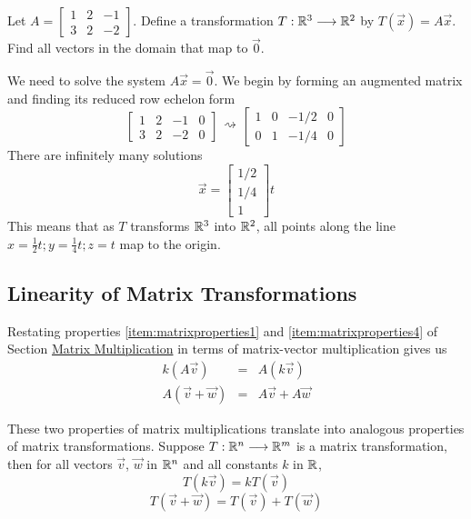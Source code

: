 \documentclass{ximera}
\begin{document}
\begin{example}\label{ex:matrixTrans1}
    Let $A=\begin{bmatrix}1&2&-1\\3&2&-2\end{bmatrix}$.  Define a transformation 
    $T:\mathbb{R}^3\longrightarrow\mathbb{R}^2$ by 
    $T(\vec{x})=A\vec{x}$.  Find all vectors in the domain that map to $\vec{0}$.
 \begin{explanation}
    We need to solve the system $A\vec{x}=\vec{0}$.  We begin by forming an augmented matrix and finding its reduced row echelon form
    $$\left[\begin{array}{ccc|c} 
 1&2&-1&0\\3&2&-2&0
 \end{array}\right]\begin{array}{c}
 \\
 \rightsquigarrow\\
 \\
 \end{array}\left[\begin{array}{ccc|c} 
 1&0&-1/2&0\\0&1&-1/4&0
 \end{array}\right]$$
 There are infinitely many solutions
 $$\vec{x}=\begin{bmatrix}1/2\\1/4\\1\end{bmatrix}t$$
 This means that as $T$ transforms $\mathbb{R}^3$ into $\mathbb{R}^2$, all points along the line $x=\frac{1}{2}t; y=\frac{1}{4}t; z=t$ map to the origin.
\end{explanation}    
\end{example}

\subsection*{Linearity of Matrix Transformations}
Restating properties \ref{item:matrixproperties1} and \ref{item:matrixproperties4} of Section \href{https://ximera.osu.edu/linearalgebradzv3/LinearAlgebraInteractiveIntro/MAT-0020/main}{Matrix Multiplication} in terms of matrix-vector multiplication gives us
\begin{eqnarray}\label{eq:linearityConstant}
 k(A\vec{v})&=&A(k\vec{v})\\
    A(\vec{v}+\vec{w})&=&A\vec{v}+A\vec{w}\label{eq:linearityAdd}
   \end{eqnarray}

These two properties of matrix multiplications translate into analogous properties of matrix transformations.  Suppose $T:\mathbb{R}^n\longrightarrow\mathbb{R}^m$ is a matrix transformation, then for all vectors $\vec{v}$, $\vec{w}$ in $\mathbb{R}^n$ and all constants $k$ in $\mathbb{R}$,
\begin{equation}\label{eq:matrixTransProp1} 
T(k\vec{v})=kT(\vec{v})
    \end{equation}
    \begin{equation}\label{eq:matrixTransProp2} T(\vec{v}+\vec{w})=T(\vec{v})+T(\vec{w})
    \end{equation}
\end{document}
